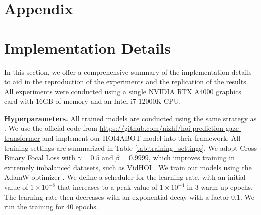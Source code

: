 \documentclass{article}
\begin{document}
\clearpage




  

\clearpage
\appendix
\section*{Appendix}
\renewcommand{\thesubsection}{\Alph{subsection}}

\section{Implementation Details} \label{apx:implementation}
In this section, we offer a comprehensive summary of the implementation details to aid in the reproduction of the experiments and the replication of the results. All experiments were conducted using a single NVIDIA RTX A4000 graphics card with 16GB of memory and an Intel i7-12000K CPU. 

\textbf{Hyperparameters.} All trained models are conducted using the same strategy as \citep{NI2023103741}. We use the official code from \href{https://github.com/nizhf/hoi-prediction-gaze-transformer}{https://github.com/nizhf/hoi-prediction-gaze-transformer} and implement our HOI4ABOT model into their framework. All training settings are summarized in Table \ref{tab:training_settings}. We adopt Cross Binary Focal Loss \citep{focalloss} with  $\gamma=0.5$ and $\beta=0.9999$, which improves training in extremely imbalanced datasets, such as VidHOI \citep{Chiou2021}. We train our models using the AdamW optimizer \cite{adamw}. We define a scheduler for the learning rate, with an initial value of $1\times10^{-8}$ that increases to a peak value of $1\times10^{-4}$ in 3 warm-up epochs. The learning rate then decreases with an exponential decay with a factor $0.1$. We run the training for 40 epochs.
\end{document}
